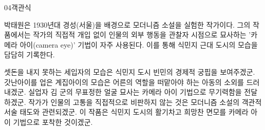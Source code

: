 \documentclass[fs85,seriesWit]{korfarm-base}
\begin{document}
\begin{kfQBlock}{04}{객관식}
\begin{kfEvidence}박태원은 1930년대 경성(서울)을 배경으로 모더니즘 소설을 실험한 작가이다. 그의 작품에서는 작가의 직접적 개입 없이 인물의 외부 행동을 관찰자 시점으로 묘사하는 '카메라 아이(camera eye)' 기법이 자주 사용된다. 이를 통해 식민지 근대 도시의 모습을 담담히 기록한다.\end{kfEvidence}
\begin{kfChoices}
\kfChoice 셋돈을 내지 못하는 세입자의 모습은 식민지 도시 빈민의 경제적 궁핍을 보여주겠군.
\kfChoice 갓난아이를 업은 계집아이의 모습은 어른의 역할을 떠맡아야 하는 아동의 소외를 드러내겠군.
\kfChoice 실업자 김 군의 무표정한 얼굴 묘사는 카메라 아이 기법으로 무기력함을 전달하겠군.
\kfChoice 작가가 인물의 고통을 직접적으로 비판하지 않는 것은 모더니즘 소설의 객관적 서술 태도와 관련되겠군.
\kfChoice 이 작품은 식민지 도시의 활기차고 희망찬 면모를 카메라 아이 기법으로 포착한 것이겠군.
\end{kfChoices}
\end{kfQBlock}

\kfEndMC
\end{document}
